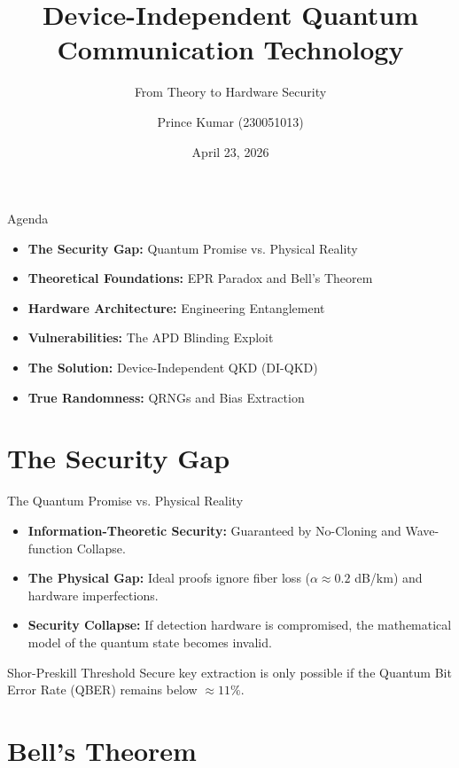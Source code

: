 \documentclass[aspectratio=169]{beamer}
\title[DI-Quantum Comm]{Device-Independent Quantum Communication Technology}
\subtitle{From Theory to Hardware Security}
\author{Prince Kumar (230051013)}
\institute{Indian Institute of Technology Indore}
\date{April 23, 2026}
\begin{document}
\begin{frame}
    \titlepage
\end{frame}

\begin{frame}{Agenda}
    \begin{itemize}
        \item \textbf{The Security Gap:} Quantum Promise vs. Physical Reality
        \item \textbf{Theoretical Foundations:} EPR Paradox and Bell's Theorem
        \item \textbf{Hardware Architecture:} Engineering Entanglement
        \item \textbf{Vulnerabilities:} The APD Blinding Exploit
        \item \textbf{The Solution:} Device-Independent QKD (DI-QKD)
        \item \textbf{True Randomness:} QRNGs and Bias Extraction
    \end{itemize}
\end{frame}

\section{The Security Gap}
\begin{frame}{The Quantum Promise vs. Physical Reality}
    \begin{itemize}
        \item \textbf{Information-Theoretic Security:} Guaranteed by No-Cloning and Wave-function Collapse.
        \item \textbf{The Physical Gap:} Ideal proofs ignore fiber loss ($\alpha \approx 0.2$ dB/km) and hardware imperfections.
        \item \textbf{Security Collapse:} If detection hardware is compromised, the mathematical model of the quantum state becomes invalid.
    \end{itemize}
    \begin{block}{Shor-Preskill Threshold}
        Secure key extraction is only possible if the Quantum Bit Error Rate (QBER) remains below $\approx 11\%$.
    \end{block}
\end{frame}

\section{Bell's Theorem}
\end{document}
